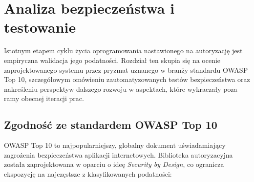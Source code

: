\documentclass{SGGW-thesis}
\begin{document}
\section{Analiza bezpieczeństwa i testowanie}

Istotnym etapem cyklu życia oprogramowania nastawionego na autoryzację jest empiryczna walidacja jego podatności. Rozdział ten skupia się na ocenie zaprojektowanego systemu przez pryzmat uznanego w branży standardu OWASP Top 10, szczegółowym omówieniu zautomatyzowanych testów bezpieczeństwa oraz nakreśleniu perspektyw dalszego rozwoju w aspektach, które wykraczały poza ramy obecnej iteracji prac.

\subsection{Zgodność ze standardem OWASP Top 10}

OWASP Top 10 to najpopularniejszy, globalny dokument uświadamiający zagrożenia bezpieczeństwa aplikacji internetowych. Biblioteka autoryzacyjna została zaprojektowana w oparciu o ideę \textit{Security by Design}, co ogranicza ekspozycję na najczęstsze z klasyfikowanych podatności:
\end{document}
